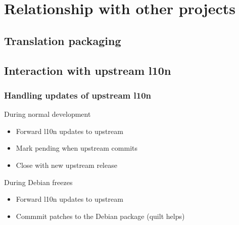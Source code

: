 \documentclass{beamer}
\begin{document}
\section{Relationship with other projects}

\subsection{Translation packaging}

\begin{frame}
  \frametitle{}
\end{frame}

\subsection{Interaction with upstream l10n}

\begin{frame}
  \frametitle{Handling updates of upstream l10n}
	\begin{block}
		{During normal development}
		\begin{itemize}
		\item
			Forward l10n updates to upstream
		\item
			Mark pending when upstream commits
		\item
			Close with new upstream release
		\end{itemize}
	\end{block}
	\begin{block}
		{During Debian freezes}
		\begin{itemize}
		\item
			Forward l10n updates to upstream
		\item
			Commmit patches to the Debian package (quilt helps)
		\end{itemize}
	\end{block}
\end{frame}
\end{document}
